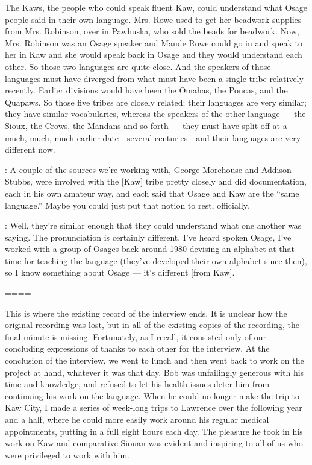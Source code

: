 \documentclass[output=paper]{LSP/langsci}
\begin{document}
The Kaws, the people who could speak fluent Kaw, could understand what Osage people said in their own language. Mrs. Rowe used to get her beadwork supplies from Mrs. Robinson, over in Pawhuska, who sold the beads for beadwork. Now, Mrs. Robinson was an Osage speaker and Maude Rowe could go in and speak to her in Kaw and she would speak back in Osage and they would understand each other. So those two languages are quite close. And the speakers of those languages must have diverged from what must have been a single tribe relatively recently. Earlier divisions would have been the Omahas, the Poncas, and the Quapaws. So those five tribes are closely related; their languages are very similar; they have similar vocabularies, whereas the speakers of the other language --- the Sioux, the Crows, the Mandans and so forth --- they must have split off at a much, much, much earlier date---several centuries---and their languages are very different now.

: A couple of the sources we're working with, George Morehouse and Addison Stubbs, were involved with the [Kaw] tribe pretty closely and did documentation, each in his own amateur way, and each said that Osage and Kaw are the ``same language.'' Maybe you could just put that notion to rest, officially.

: Well, they're similar enough that they could understand what one another was saying. The pronunciation is certainly different. I've heard spoken Osage, I've worked with a group of Osages back around 1980 devising an alphabet at that time for teaching the language (they've developed their own alphabet since then), so I know something about Osage --- it's different [from Kaw].

====

\noindent This is where the existing record of the interview ends. It is unclear how the original recording was lost, but in all of the existing copies of the recording, the final minute is missing. Fortunately, as I recall, it consisted only of our concluding expressions of thanks to each other for the interview. At the conclusion of the interview, we went to lunch and then went back to work on the project at hand, whatever it was that day. Bob was unfailingly generous with his time and knowledge, and refused to let his health issues deter him from continuing his work on the language. When he could no longer make the trip to Kaw City, I made a series of week-long trips to Lawrence over the following year and a half, where he could more easily work around his regular medical appointments, putting in a full eight hours each day. The pleasure he took in his work on Kaw and comparative Siouan was evident and inspiring to all of us who were privileged to work with him. 
\end{document}
